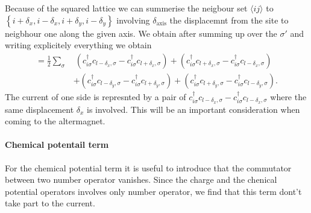 \documentclass[../main.tex]{subfile}
\begin{document}
Because of the squared lattice we can summerise the neigbour set $\langle ij\rangle$ to $\left\{ i + \delta_x , i - \delta_x, i + \delta_y, i - \delta_y   \right\}$ involving
$\delta_{\text{axis}}$ the displacemnt from the site to neigbhour one along the given axis.
We obtain after summing up over the $\sigma'$ and writing explicitely everything we obtain 
\begin{equation}\label{Eq:CurrentHoppingCommu}
    \begin{aligned}
        =\frac{1}{2} \sum_{\sigma} 
       &~(c_{i\sigma}^{\dagger}c_{l-\delta_x,\sigma} -c_{i\sigma}^{\dagger}c_{l+\delta_x,\sigma})  
       +(c_{i\sigma}^{\dagger}c_{l+\delta_x,\sigma} -c_{i\sigma}^{\dagger}c_{l-\delta_x,\sigma})\\
       &+(c_{i\sigma}^{\dagger}c_{l-\delta_y,\sigma} -c_{i\sigma}^{\dagger}c_{l+\delta_y,\sigma})
       +(c_{i\sigma}^{\dagger}c_{l+\delta_y,\sigma} -c_{i\sigma}^{\dagger}c_{l-\delta_y,\sigma}).
\end{aligned}
\end{equation}
The current of one side is represnted by a pair of $c_{i\sigma}^{\dagger}c_{l-\delta_x,\sigma} -c_{i\sigma}^{\dagger}c_{l-\delta_x,\sigma}$
where the same displacement $\delta_x$ is involved. This will be an important consideration when coming to the altermagnet.\\

\paragraph{Chemical potentail term} For the chemical potential term it is useful to introduce that the commutator between two number operator vanishes. 
Since the charge and the chenical potential operators involves only number operator, we find that this term dont't take part
to the current.
\end{document}
